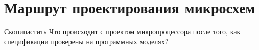 \chapter{Маршрут проектирования микросхем}\label{appendix:ic-route}


\todo Скопипастить
Что происходит с проектом микропроцессора после того, как спецификации проверены на программных моделях?


